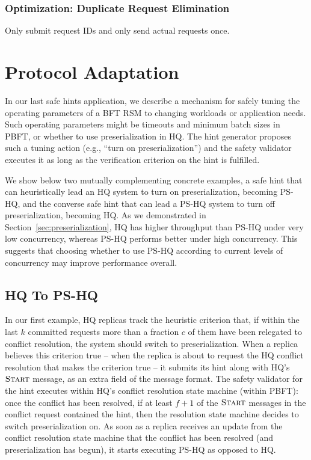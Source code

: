 \documentclass[twocolumn,10pt]{article}
\newcommand{\msg}[1]{\ensuremath{\textsc{#1}}}
\begin{document}
\subsubsection{Optimization: Duplicate Request Elimination}

Only submit request IDs and only send actual requests once.





\section{Protocol Adaptation}
\label{sec:protocolSwitching}

In our last safe hints application, we describe a mechanism for safely
tuning the operating parameters of a BFT RSM to changing workloads or
application needs.  Such operating parameters might be timeouts and minimum
batch sizes in PBFT, or whether to use preserialization in HQ.  The hint
generator proposes such a tuning action (e.g., ``turn on
preserialization'') and the safety validator executes it as long
as the verification criterion on the hint is fulfilled.

We show below two mutually complementing concrete examples, a safe hint
that can heuristically lead an HQ system to turn on preserialization,
becoming PS-HQ, and the converse safe hint that can lead a PS-HQ system
to turn off preserialization, becoming HQ.  As we demonstrated in
Section~\ref{sec:preserialization}, HQ has higher throughput than PS-HQ
under very low concurrency, whereas PS-HQ performs better under high
concurrency.  This suggests that choosing whether to use PS-HQ according
to current levels of concurrency may improve performance overall.




\subsection{HQ To PS-HQ}

In our first example, HQ replicas track the heuristic criterion that, if within
the last $k$ committed requests more than a fraction $c$ of them have been
relegated to conflict resolution, the system should switch to preserialization.
When a replica believes this criterion true -- when the replica
is about to request the HQ conflict resolution that makes the criterion
true -- it submits its hint along with HQ's \msg{Start} message, as an
extra field of the message format.  The safety validator for the hint
executes within HQ's conflict resolution state machine (within PBFT):
once the conflict has been resolved, if at least $f+1$ of the \msg{Start} messages
in the conflict request contained the hint, then the resolution
state machine decides to switch preserialization on.  As soon as a
replica receives an update from the conflict resolution state machine
that the conflict has been resolved (and preserialization has begun), it
starts executing PS-HQ as opposed to HQ.
\end{document}
